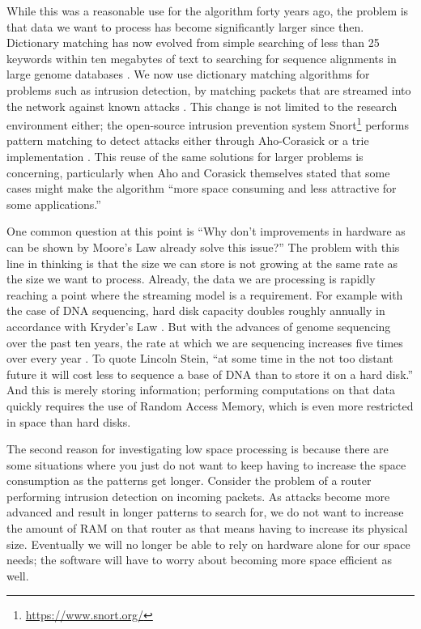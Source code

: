 \documentclass[ %
                    author={Dominic Joseph Moylett},
                    degree={MEng},
                     title={Dictionary Matching with Fingerprints},
                  subtitle={An Empirical Analysis},
                      type={research},
                      year={2015} ]{dissertation}
\begin{document}
While this was a reasonable use for the algorithm forty years ago, the problem is that data we want to process has become significantly larger since then. Dictionary matching has now evolved from simple searching of less than 25 keywords within ten megabytes of text to searching for sequence alignments in large genome databases \cite{15713233}. We now use dictionary matching algorithms for problems such as intrusion detection, by matching packets that are streamed into the network against known attacks \cite{1354682}. This change is not limited to the research environment either; the open-source intrusion prevention system Snort\footnote{\url{https://www.snort.org/}} performs pattern matching to detect attacks either through Aho-Corasick or a trie implementation \cite{website:snort-algo}. This reuse of the same solutions for larger problems is concerning, particularly when Aho and Corasick themselves stated that some cases might make the algorithm ``more space consuming and less attractive for some applications.'' \cite{Aho:1975:ESM:360825.360855}

One common question at this point is ``Why don't improvements in hardware as can be shown by Moore's Law \cite{658762} already solve this issue?'' The problem with this line in thinking is that the size we can store is not growing at the same rate as the size we want to process. Already, the data we are processing is rapidly reaching a point where the streaming model is a requirement. For example with the case of DNA sequencing, hard disk capacity doubles roughly annually in accordance with Kryder's Law \cite{scientificamerican0805-32}. But with the advances of genome sequencing over the past ten years, the rate at which we are sequencing increases five times over every year \cite{20622843}. To quote Lincoln Stein, ``at some time in the not too distant future it will cost less to sequence a base of DNA than to store it on a hard disk.'' \cite{20441614} And this is merely storing information; performing computations on that data quickly requires the use of Random Access Memory, which is even more restricted in space than hard disks.

The second reason for investigating low space processing is because there are some situations where you just do not want to keep having to increase the space consumption as the patterns get longer. Consider the problem of a router performing intrusion detection on incoming packets. As attacks become more advanced and result in longer patterns to search for, we do not want to increase the amount of RAM on that router as that means having to increase its physical size. Eventually we will no longer be able to rely on hardware alone for our space needs; the software will have to worry about becoming more space efficient as well.
\end{document}
